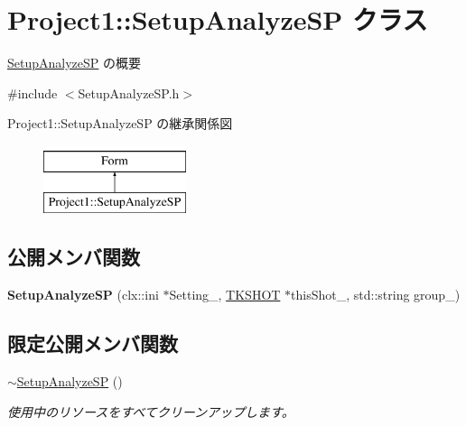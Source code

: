 \hypertarget{class_project1_1_1_setup_analyze_s_p}{}\section{Project1\+:\+:Setup\+Analyze\+SP クラス}
\label{class_project1_1_1_setup_analyze_s_p}


\hyperlink{class_project1_1_1_setup_analyze_s_p}{Setup\+Analyze\+SP} の概要  




{\ttfamily \#include $<$Setup\+Analyze\+S\+P.\+h$>$}

Project1\+:\+:Setup\+Analyze\+SP の継承関係図\begin{figure}[H]
\begin{center}
\leavevmode
\includegraphics[height=2.000000cm]{class_project1_1_1_setup_analyze_s_p}
\end{center}
\end{figure}
\subsection*{公開メンバ関数}
\begin{DoxyCompactItemize}
\item 
\mbox{\label{class_project1_1_1_setup_analyze_s_p_a58fbf31604206da76cead585e94498f2}} 
{\bfseries Setup\+Analyze\+SP} (clx\+::ini $\ast$Setting\+\_\+, \hyperlink{class_t_k_s_h_o_t}{T\+K\+S\+H\+OT} $\ast$this\+Shot\+\_\+, std\+::string group\+\_\+)
\end{DoxyCompactItemize}
\subsection*{限定公開メンバ関数}
\begin{DoxyCompactItemize}
\item 
\hyperlink{class_project1_1_1_setup_analyze_s_p_abb81aeae2341ceec276805a830e94b67}{$\sim$\+Setup\+Analyze\+SP} ()
\begin{DoxyCompactList}\small\item\em 使用中のリソースをすべてクリーンアップします。 \end{DoxyCompactList}\end{DoxyCompactItemize}


